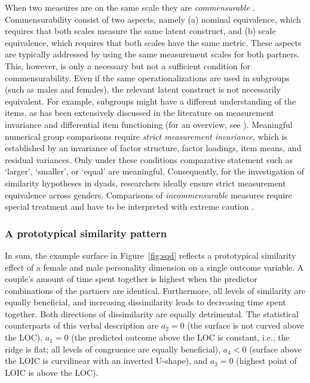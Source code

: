 \documentclass[jou,a4paper,draftfirst]{apa6}
\begin{document}
When two measures are on the same scale they are \emph{commensurable} \parencite{edwards_relationship_2007}. Commensurability consist of two aspects, namely (a) nominal equivalence, which requires that both scales measure the same latent construct, and (b) scale equivalence, which requires that both scales have the same metric. These aspects are typically addressed by using the same measurement scales for both partners. This, however, is only a necessary but not a sufficient condition for commensurability. Even if the same operationalizations are used in subgroups (such as males and females), the relevant latent construct is not necessarily equivalent. For example, subgroups might have a different understanding of the items, as has been extensively discussed in the literature on measurement invariance and differential item functioning (for an overview, see ). Meaningful numerical group comparisons require \emph{strict measurement invariance}, which is established by an invariance of factor structure, factor loadings, item means, and residual variances. Only under these conditions comparative statement such as `larger', `smaller', or `equal' are meaningful. Consequently, for the investigation of similarity hypotheses in dyads, researchers ideally ensure strict measurement equivalence across genders. Comparisons of \textit{incommensurable} measures require special treatment and have to be interpreted with extreme caution \parencite{schonbrodt_testing_2016}.

\subsubsection{A prototypical similarity pattern}
In sum, the example surface in Figure~\ref{fig:sqd} reflects a prototypical similarity effect of a female and male personality dimension on a single outcome variable. A couple’s amount of time spent together is highest when the predictor combinations of the partners are identical. Furthermore, all levels of similarity are equally beneficial, and increasing dissimilarity leads to decreasing time spent together. Both directions of dissimilarity are equally detrimental. The statistical counterparts of this verbal description are $a_2 = 0$ (the surface is not curved above the LOC), $a_1 = 0$ (the predicted outcome above the LOC is constant, i.e., the ridge is flat; all levels of congruence are equally beneficial), $a_4 < 0$ (surface above the LOIC is curvilinear with an inverted U-shape), and $a_3 = 0$ (highest point of LOIC is above the LOC). 
\end{document}
